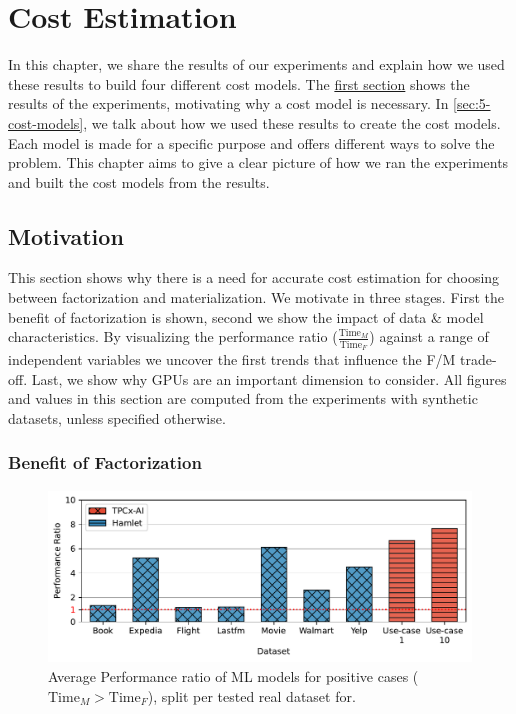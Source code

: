 
\chapter{Cost Estimation}

\label{chapter:cost-estimation}
In this chapter, we share the results of our experiments and explain how we used these results to build four different cost models. The \hyperref[sec:5-motivation]{first section} shows the results of the experiments, motivating why a cost model is necessary. In \autoref{sec:5-cost-models}, we talk about how we used these results to create the cost models. Each model is made for a specific purpose and offers different ways to solve the problem. This chapter aims to give a clear picture of how we ran the experiments and built the cost models from the results.

\section{Motivation}
\label{sec:5-motivation}
This section shows why there is a need for accurate cost estimation for choosing between factorization and materialization. We motivate in three stages. First the benefit of factorization is shown, second we show the impact of data \& model characteristics. By visualizing the performance ratio ($\frac{\text{Time}_M}{\text{Time}_F}$) against a range of independent variables we uncover the first trends that influence the F/M trade-off. Last, we show why GPUs are an important dimension to consider. All figures and values in this section are computed from the experiments with synthetic datasets, unless specified otherwise.

\subsection{Benefit of Factorization}
\begin{figure}[ht]
    \centering
    \includegraphics[width=\linewidth]{chapters/05_cost_estimation/figures/real_datasets_speedup.pdf}
    \caption[Performance gain with factorization on real datasets]{Average Performance ratio of ML models for positive cases ($\text{Time}_M > \text{Time}_F$), split per tested real dataset for.}
    \label{fig:5-real-perf-ratio}
\end{figure}

